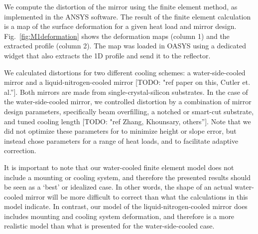 \documentclass{iucr}              %
\newcommand{\todo}[1]{{\color{red}[TODO: "#1'']}}
\begin{document}
We compute the distortion of the mirror using the finite element method, as implemented in the ANSYS software. The result of the finite element calculation is a map of the surface deformation for a given heat load and mirror design. Fig.~\ref{fig:M1deformation} shows the deformation maps (column 1) and the extracted profile (column 2). The map was loaded in OASYS using a dedicated widget that also extracts the 1D profile and send it to the reflector.

We calculated distortions for two different cooling schemes: a water-side-cooled mirror and a liquid-nitrogen-cooled mirror \todo{ref paper on this, Cutler et. al.}. Both mirrors are made from single-crystal-silicon substrates. In the case of the water-side-cooled mirror, we controlled distortion by a combination of mirror design parameters, specifically beam overfilling, a notched or smart-cut substrate, and tuned cooling length \todo{ref Zhang, Khounsary, others}.  Note that we did not optimize these parameters for to minimize height or slope error, but instead chose parameters for a range of heat loads, and to facilitate adaptive correction.

It is important to note that our water-cooled finite element model does not include a mounting or cooling system, and therefore the presented results should be seen as a `best' or idealized case.  In other words, the shape of an actual water-cooled mirror will be more difficult to correct than what the calculations in this model indicate. In contrast, our model of the liquid-nitrogen-cooled mirror does includes mounting and cooling system deformation, and therefore is a more realistic model than what is presented for the water-side-cooled case.
\end{document}
